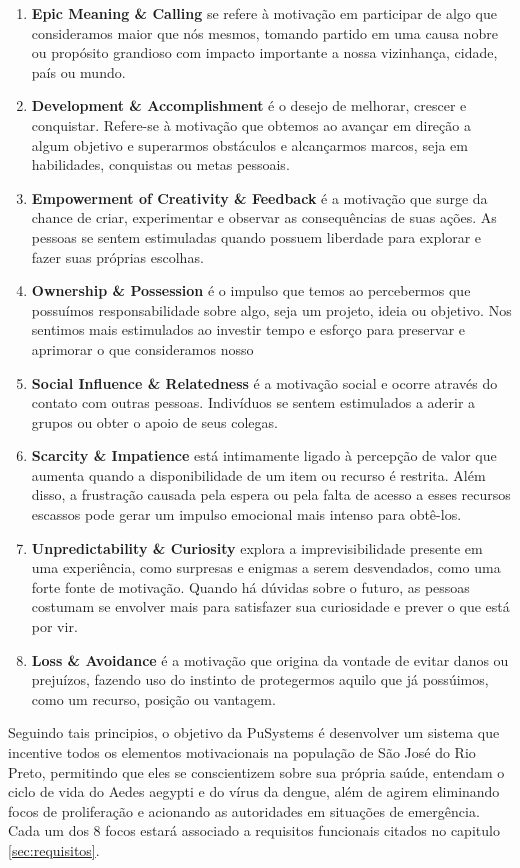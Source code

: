 \documentclass[a5paper, 12pt]{article}
\begin{document}
\begin{enumerate}
    \item \textbf{Epic Meaning \& Calling} se refere à motivação em participar de algo que consideramos maior que nós mesmos, tomando partido em uma causa nobre ou propósito grandioso com impacto importante a nossa vizinhança, cidade, país ou mundo. 
    \item \textbf{Development \& Accomplishment} é o desejo de melhorar, crescer e conquistar. Refere-se à motivação que obtemos ao avançar em direção a algum objetivo e superarmos obstáculos e alcançarmos marcos, seja em habilidades, conquistas ou metas pessoais.
    \item \textbf{Empowerment of Creativity \& Feedback} é a motivação que surge da chance de criar, experimentar e observar as consequências de suas ações. As pessoas se sentem estimuladas quando possuem liberdade para explorar e fazer suas próprias escolhas. 
    \item \textbf{Ownership \& Possession} é o impulso que temos ao percebermos que possuímos responsabilidade sobre algo, seja um projeto, ideia ou objetivo. Nos sentimos mais estimulados ao investir tempo e esforço para preservar e aprimorar o que consideramos nosso
    \item \textbf{Social Influence \& Relatedness} é a motivação social e ocorre através do contato com outras pessoas. Indivíduos se sentem estimulados a aderir a grupos ou  obter o apoio de seus colegas. 
    \item \textbf{Scarcity \& Impatience} está intimamente ligado à percepção de valor que aumenta quando a disponibilidade de um item ou recurso é restrita. Além disso, a frustração causada pela espera ou pela falta de acesso a esses recursos escassos pode gerar um impulso emocional mais intenso para obtê-los.
    \item \textbf{Unpredictability \& Curiosity} explora a imprevisibilidade presente em uma experiência, como surpresas e enigmas a serem desvendados, como uma forte fonte de motivação. Quando há dúvidas sobre o futuro, as pessoas costumam se envolver mais para satisfazer sua curiosidade e prever o que está por vir.
    \item \textbf{Loss \& Avoidance} é a motivação que origina da vontade de evitar danos ou prejuízos, fazendo uso do instinto de protegermos aquilo que já possúimos, como um recurso, posição ou vantagem.
\end{enumerate}

Seguindo tais principios, o objetivo da PuSystems é desenvolver um sistema que incentive todos os elementos motivacionais na população de São José do Rio Preto, permitindo que eles se conscientizem sobre sua própria saúde, entendam o ciclo de vida do Aedes aegypti e do vírus da dengue, além de agirem eliminando focos de proliferação e acionando as autoridades em situações de emergência. Cada um dos 8 focos estará associado a requisitos funcionais citados no capitulo \ref{sec:requisitos}.
\end{document}
